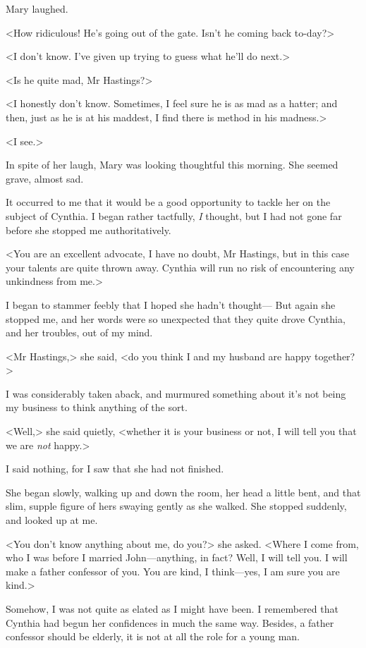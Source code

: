  Mary laughed. 

 <How ridiculous! He's going out of the gate. Isn't he coming back to-day?> 

 <I don't know. I've given up trying to guess what he'll do next.> 

 <Is he quite mad, Mr Hastings?> 

 <I honestly don't know. Sometimes, I feel sure he is as mad as a hatter; and then, just as he is at his maddest, I find there is method in his madness.> 

 <I see.> 

 In spite of her laugh, Mary was looking thoughtful this morning. She seemed grave, almost sad. 

 It occurred to me that it would be a good opportunity to tackle her on the subject of Cynthia. I began rather tactfully, \emph{I} thought, but I had not gone far before she stopped me authoritatively. 

 <You are an excellent advocate, I have no doubt, Mr Hastings, but in this case your talents are quite thrown away. Cynthia will run no risk of encountering any unkindness from me.> 

 I began to stammer feebly that I hoped she hadn't thought— But again she stopped me, and her words were so unexpected that they quite drove Cynthia, and her troubles, out of my mind. 

 <Mr Hastings,> she said, <do you think I and my husband are happy together?> 

 I was considerably taken aback, and murmured something about it's not being my business to think anything of the sort. 

 <Well,> she said quietly, <whether it is your business or not, I will tell you that we are \emph{not} happy.> 

 I said nothing, for I saw that she had not finished. 

 She began slowly, walking up and down the room, her head a little bent, and that slim, supple figure of hers swaying gently as she walked. She stopped suddenly, and looked up at me. 

 <You don't know anything about me, do you?> she asked. <Where I come from, who I was before I married John—anything, in fact? Well, I will tell you. I will make a father confessor of you. You are kind, I think—yes, I am sure you are kind.> 

 Somehow, I was not quite as elated as I might have been. I remembered that Cynthia had begun her confidences in much the same way. Besides, a father confessor should be elderly, it is not at all the role for a young man. 

